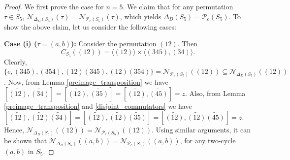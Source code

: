 \documentclass[12pt,a4paper]{article}
\begin{document}
\begin{proof}
We first prove the case for $n=5$. We claim that for any permutation $\tau\in S_5$, $\mathcal{N}_{\Delta_D(S_5)}(\tau)=\mathcal{N}_{\mathcal{P}_e(S_5)}(\tau)$, which yields $\Delta_D(S_5)=\mathcal{P}_e(S_5)$. To show the above claim, let us consider the following cases:  

\vspace{.3cm}
\noindent\underline{\textbf{Case (i) ($\tau=(a,b)$):}} Consider the permutation $(12)$. Then \[C_{S_5}((12))=\langle (12)\rangle\times\langle (345),(34)\rangle.\] Clearly, $\{e,(345),(354),(12)(345),(12)(354)\}=\mathcal{N}_{\mathcal{P}_e(S_5)}((12))\subseteq \mathcal{N}_{\Delta_D(S_5)}((12))$. Now, from Lemma \ref{preimage_transposition} we have $[\tilde{(12)},\tilde{(34)}]=[\tilde{(12)},\tilde{(35)}]=[\tilde{(12)},\tilde{(45)}]=z$. Also, from Lemma \ref{preimage_transposition} and \ref{disjoint_commutators} we have $[\tilde{(12)},\tilde{(12)}\tilde{(34)}]=[\tilde{(12)},\tilde{(12)}\tilde{(35)}]=[\tilde{(12)},\tilde{(12)}\tilde{(45)}]=z$. Hence, $\mathcal{N}_{\Delta_D(S_5)}((12))=\mathcal{N}_{\mathcal{P}_e(S_5)}((12))$. Using similar arguments, it can be shown that $\mathcal{N}_{\Delta_D(S_5)}((a,b))=\mathcal{N}_{\mathcal{P}_e(S_5)}((a,b))$, for any two-cycle $(a,b)$ in $S_5$.









\end{proof}
\end{document}
